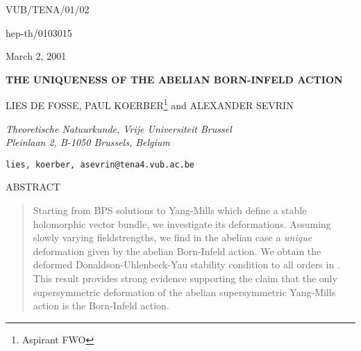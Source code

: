 \documentclass[a4paper,12pt,oneside]{article}
\begin{document}
\thispagestyle{empty}
\setcounter{page}{0}
\renewcommand{\theequation}{\thesection.\arabic{equation}}

{\hfill{VUB/TENA/01/02}} 

{\hfill{hep-th/0103015}}

{\hfill{March 2, 2001}}

\vspace{2cm}

\begin{center}
{\bf THE UNIQUENESS OF THE ABELIAN BORN-INFELD ACTION}

\vspace{1.4cm}

LIES DE FOSSE, PAUL KOERBER\footnote{Aspirant FWO} and ALEXANDER SEVRIN

\vspace{.2cm}

{\em Theoretische Natuurkunde, Vrije Universiteit Brussel} \\
{\em Pleinlaan 2, B-1050 Brussels, Belgium} \\
\end{center}

\vspace{-.1cm}

\centerline{{\tt lies, koerber, asevrin@tena4.vub.ac.be}}
\vspace{1cm}
\centerline{ABSTRACT}

\vspace{- 4 mm}  %

\begin{quote}\small
Starting from BPS solutions to Yang-Mills which define a stable holomorphic 
vector bundle, we investigate its deformations. Assuming slowly varying 
fieldstrengths, we find in the abelian case a {\em unique} deformation given by 
the abelian Born-Infeld action. We obtain the deformed 
Donaldson-Uhlenbeck-Yau stability condition to all orders in \coordHE{}. This 
result provides strong evidence supporting the claim that the only 
supersymmetric deformation of the abelian \coordHE{} supersymmetric Yang-Mills 
action is the Born-Infeld action. 
\end{quote}
\baselineskip18pt
\noindent

\vspace{5mm}

\newpage

\setcounter{equation}{0}
\end{document}
